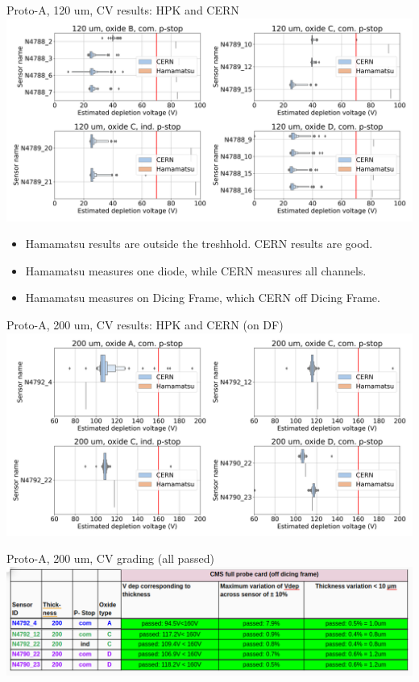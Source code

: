 \documentclass{beamer}
\begin{document}
\begin{frame}{Proto-A, 120 um, CV results: HPK and CERN}
  \includegraphics[width=.8\textwidth]{plots/CV_ComparisonHPKCERN_120um.png}
  \begin{block}{}
    \begin{itemize}
      \item Hamamatsu results are outside the treshhold. CERN results are good.
      \item Hamamatsu measures one diode, while CERN measures all channels.
      \item Hamamatsu measures on Dicing Frame, which CERN off Dicing Frame.
    \end{itemize}
  \end{block}
\end{frame}
\begin{frame}{Proto-A, 200 um, CV results: HPK and CERN (on DF)}
  \includegraphics[width=.9\textwidth]{plots/CV_ComparisonHPK_200um.png}
  \href{https://indico.cern.ch/event/1132823/contributions/4755812/attachments/2399581/4103704/LD\%20proto-A\%20sensors\%20200\%20um\%2C\%20ALPS\%20Winter\%202022.pdf}{}
\end{frame}

\begin{frame}{Proto-A, 200 um, CV grading (all passed)}
  \includegraphics[width=.7\textwidth]{plots/CV_grading_200um.png}
\end{frame}
\end{document}
